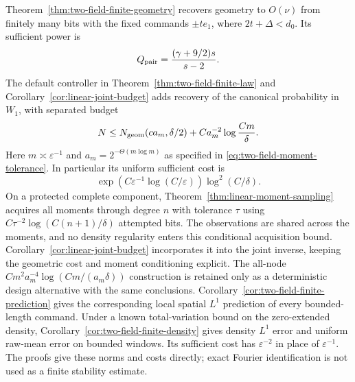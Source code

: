 Theorem~\ref{thm:two-field-finite-geometry} recovers geometry to
$O(\nu)$ from finitely many bits with the fixed commands $\pm te_1$,
where $2t+\Delta<d_0$. Its sufficient power is
\[
            Q_{\rm pair}=\frac{(\gamma+9/2)s}{s-2}.
\]
The default controller in Theorem~\ref{thm:two-field-finite-law}
and Corollary~\ref{cor:linear-joint-budget} adds recovery of the
canonical probability in $W_1$, with separated budget
\[
 N\le N_{\rm geom}(c a_m,\delta/2)
                       +Ca_m^{-2}\log\frac{Cm}{\delta}.
\]
Here $m\asymp\varepsilon^{-1}$ and
$a_m=2^{-\Theta(m\log m)}$ as specified in
\eqref{eq:two-field-moment-tolerance}. In particular its uniform
sufficient cost is
\[
 \exp(C\varepsilon^{-1}\log(C/\varepsilon))\log^2(C/\delta).
\]
On a protected complete component, Theorem~\ref{thm:linear-moment-sampling}
acquires all moments through degree $n$ with tolerance $\tau$ using
$C\tau^{-2}\log(C(n+1)/\delta)$ attempted bits. The observations are
shared across the moments, and no density regularity enters this
conditional acquisition bound. Corollary~\ref{cor:linear-joint-budget}
incorporates it into the joint inverse, keeping the geometric cost
and moment conditioning explicit. The all-node
$Cm^2a_m^{-4}\log(Cm/(a_m\delta))$ construction is retained only as
a deterministic design alternative with the same conclusions.
Corollary~\ref{cor:two-field-finite-prediction} gives the corresponding
local spatial $L^1$ prediction of every bounded-length command.
Under a known total-variation bound on the zero-extended density,
Corollary~\ref{cor:two-field-finite-density} gives density $L^1$ error
and uniform raw-mean error on bounded windows. Its sufficient cost
has $\varepsilon^{-2}$ in place of $\varepsilon^{-1}$. The proofs
give these norms and costs directly; exact Fourier identification is
not used as a finite stability estimate.

